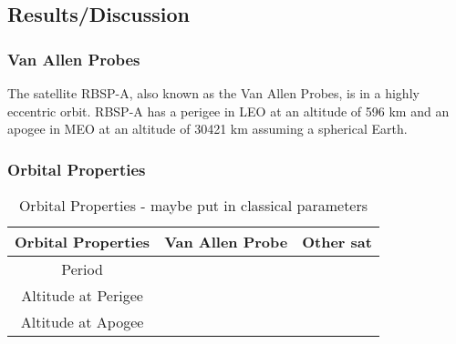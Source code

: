 \documentclass[Space3_Assign1.tex]{subfiles}
\begin{document}
\subsection{Results/Discussion}
\subsubsection{Van Allen Probes}
The satellite RBSP-A, also known as the Van Allen Probes, is in a highly eccentric orbit. RBSP-A has a perigee in LEO at an altitude of 596 km and an apogee in MEO at an altitude of 30421 km assuming a spherical Earth. 


\subsubsection{Orbital Properties}
\begin{table}[h]
\centering
\caption{Orbital Properties - maybe put in classical parameters}
\begin{tabular}{|c|c|c|}
\hline
Orbital Properties & Van Allen Probe & Other sat \\\hline
Period & & \\\hline
Altitude at Perigee & & \\\hline
Altitude at Apogee & & \\\hline

\end{tabular}
\end{table}
\end{document}
